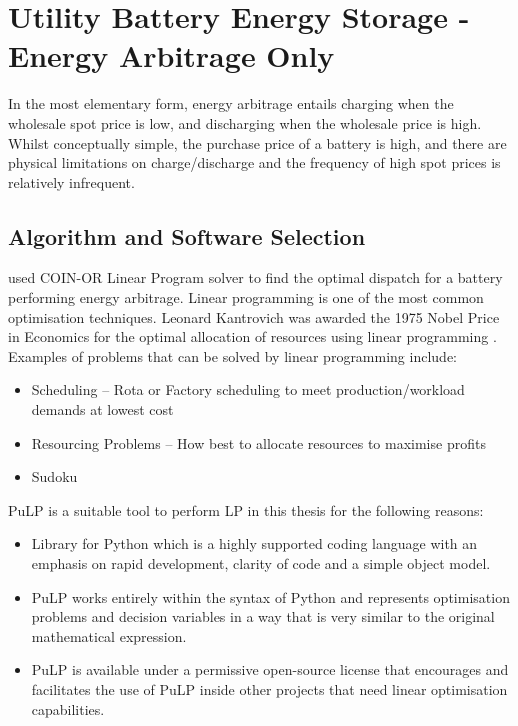 \chapter{ Utility Battery Energy Storage - Energy Arbitrage Only}
In the most elementary form, energy arbitrage entails charging when the wholesale spot price is low, and discharging when the wholesale price is high. Whilst conceptually simple, the purchase price of a battery is high, and there are physical limitations on charge/discharge and the frequency of high spot prices is relatively infrequent.
\section{ Algorithm and Software Selection }
\parencite{McConnell} used COIN-OR Linear Program solver to find the optimal dispatch for a battery performing energy arbitrage. Linear programming is one of the most common optimisation techniques. Leonard Kantrovich was awarded the 1975 Nobel Price in Economics for the optimal allocation of resources using linear programming \parencite{PythonPulp}. Examples of problems that can be solved by linear programming include:
\begin{itemize}
    \item Scheduling – Rota or Factory scheduling to meet production/workload demands at lowest cost
    \item Resourcing Problems – How best to allocate resources to maximise profits
    \item Sudoku
\end{itemize}
PuLP is a suitable tool to perform LP in this thesis for the following reasons: 
\begin{itemize}
    \item Library for Python which is a highly supported coding language with an emphasis on rapid development, clarity of code and a simple object model. 
    \item PuLP works entirely within the syntax of Python and represents optimisation problems and decision variables in  a way that is very similar to the original mathematical expression. 
    \item PuLP is available under a permissive open-source license that encourages and facilitates the use of PuLP inside other projects that need linear optimisation capabilities.
\end{itemize}

